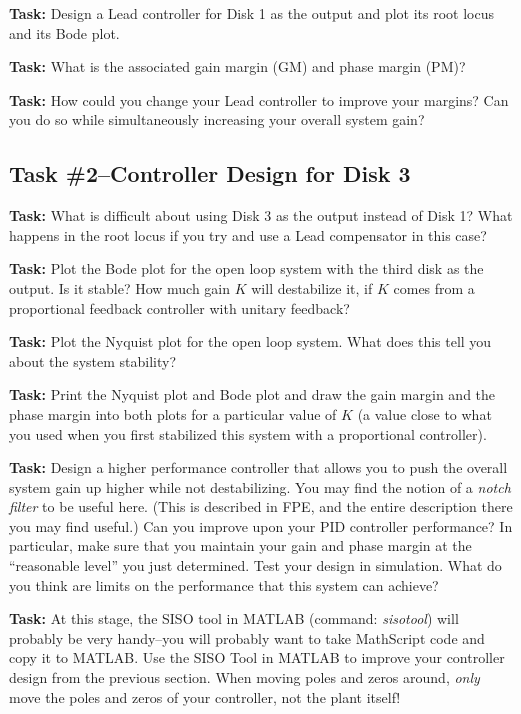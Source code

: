 \noindent \textbf{Task:}  Design a Lead controller for Disk 1 as the output  
and plot its root locus and its Bode plot.

\noindent \textbf{Task:}  What is the associated gain margin (GM) and phase
margin (PM)?

\noindent \textbf{Task:}  How could you change your Lead controller to improve
your margins?  Can you do so while simultaneously increasing your overall system
gain?


\subsection{Task \#2--Controller Design for Disk 3}

\noindent \textbf{Task:}  What is difficult about using Disk 3 as the output
instead of Disk 1?  What happens in the root locus if you try and use a Lead
compensator in this case?

\noindent \textbf{Task:}  Plot the Bode plot for the open loop system with the
third disk as the output.  Is it stable?  How much gain $K$ will destabilize it,
if $K$ comes from a proportional feedback controller with unitary feedback?

\noindent \textbf{Task:}  Plot the Nyquist plot for the open loop system.  What
does this tell you about the system stability?

\noindent \textbf{Task:}  Print the Nyquist plot and Bode plot and draw the 
gain margin and the phase margin into both plots for a particular value of $K$
(a value close to what you used when you first stabilized this system with a
proportional controller).

\noindent \textbf{Task:}  Design a higher performance controller that allows you
to push the overall system gain up higher while not destabilizing.  You may find
the notion of a \emph{notch filter} to be useful here.  (This is described in
FPE, and the entire description there you may find useful.)  Can you improve
upon your PID controller performance?  In particular, make sure that you
maintain your gain and phase margin at the ``reasonable level'' you just
determined.  Test your design in simulation.  What do you think are limits on
the performance that this system can achieve?

\noindent \textbf{Task:}  
At this stage, the SISO tool in MATLAB (command: \emph{sisotool}) will probably be very
handy--you will probably want to take MathScript code and copy it to MATLAB.
Use the SISO Tool in MATLAB to improve your controller design from the previous
section.  When moving poles and zeros around, \emph{only} move the poles and
zeros of your controller, not the plant itself!

